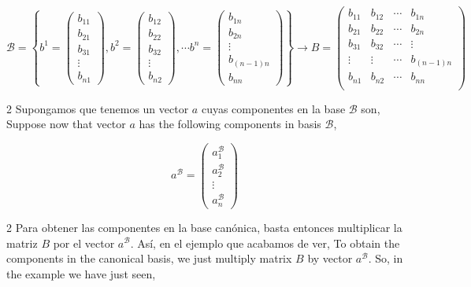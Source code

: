 \begin{equation*}
\mathcal{B}=\left\lbrace b^1=\begin{pmatrix}
b_{11}\\
b_{21}\\
b_{31}\\
\vdots \\
b_{n1}
\end{pmatrix},b^2=\begin{pmatrix}
b_{12}\\
b_{22}\\
b_{32}\\
\vdots \\
b_{n2}
\end{pmatrix},
\cdots
b^n=\begin{pmatrix}
b_{1n}\\
b_{2n}\\
\vdots \\
b_{(n-1)n}\\
b_{nn}
\end{pmatrix} \right\rbrace \rightarrow
B=\begin{pmatrix}
b_{11}&b_{12}& \cdots & b_{1n}\\
b_{21}&b_{22}& \cdots & b_{2n}\\
b_{31}&b_{32}& \cdots & \vdots \\
\vdots & \vdots & \cdots &  b_{(n-1)n}\\
b_{n1}&b_{n2}& \cdots & b_{nn}\\
\end{pmatrix}
\end{equation*}
\begin{paracol}{2}
Supongamos que tenemos un vector $a$ cuyas componentes en la base $\mathcal{B}$ son,
\switchcolumn
Suppose now that vector $a$ has the following components in basis $\mathcal{B}$,
\end{paracol}

\begin{equation*}
a^{\mathcal{B}}=\begin{pmatrix}
a_1^{\mathcal{B}}\\
a_2^{\mathcal{B}}\\
\vdots \\
a_n^{\mathcal{B}}
\end{pmatrix}
\end{equation*}

\begin{paracol}{2}
Para obtener las componentes en la base canónica, basta entonces multiplicar la matriz $B$ por el vector $a^{\mathcal{B}}$. Así, en el ejemplo que acabamos de ver,
\switchcolumn
To obtain the components in the canonical basis, we just multiply matrix $B$ by vector $a^{\mathcal{B}}$. So, in the example we have just seen,
\end{paracol}

